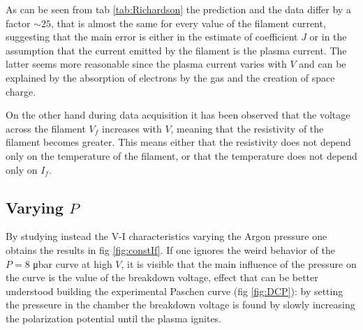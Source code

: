 \documentclass[11pt,a4 paper]{article}
\begin{document}
As can be seen from tab \ref{tab:Richardson} the prediction and the data differ by a factor $\sim 25$, that is almost the same for every value of the filament current, suggesting that the main error is either in the estimate of coefficient $J$ or in the assumption that the current emitted by the filament is the plasma current. The latter seems more reasonable since the plasma current varies with $V$ and can be explained by the absorption of electrons by the gas and the creation of space charge.

On the other hand during data acquisition it has been observed that the voltage across the filament $V_f$ increases with $V$, meaning that the resistivity of the filament becomes greater. This means either that the resistivity does not depend only on the temperature of the filament, or that the temperature does not depend only on $I_f$.


\subsection{Varying $P$}

By studying instead the V-I characteristics varying the Argon pressure one obtains the results in fig \ref{fig:constIf}. If one ignores the weird behavior of the $P = 8$ \si{\micro\bar} curve at high $V$, it is visible that the main influence of the pressure on the curve is the value of the breakdown voltage, effect that can be better understood building the experimental Paschen curve (fig \ref{fig:DCP}): by setting the presseure in the chamber the breakdown voltage is found by slowly increasing the polarization potential until the plasma ignites.
\end{document}
